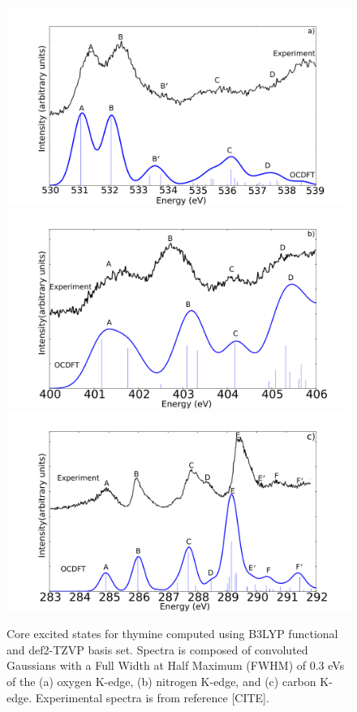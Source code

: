 \documentclass[12pt]{article}
\begin{document}
  \begin{figure}[!ht]
\centering
\includegraphics[scale=0.15]{ThymineOKexperiment.png}\\
\includegraphics[scale=0.15]{ThymineNKexperiment.png} \\
\includegraphics[scale=0.15]{ThymineCKexperiment.png}
\caption{Core excited states for thymine computed using B3LYP functional and def2-TZVP basis set. Spectra is composed of convoluted Gaussians with a Full Width at Half Maximum (FWHM) of 0.3 eVs of the (a) oxygen K-edge, (b) nitrogen K-edge, and (c) carbon K-edge. Experimental spectra is from reference [CITE].}
\label{figure:Thymine}
\end{figure}
\end{document}
